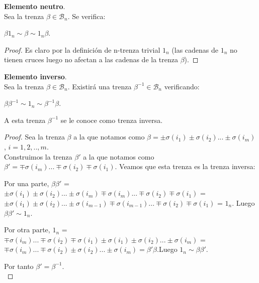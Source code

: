 \documentclass[14pt]{extarticle}
\begin{document}
\begin{pro}  \textbf{Elemento neutro}.\label{prodneutro}\\
	Sea la trenza $\beta \in \mathscr{B}_{n}$. Se verifica:
	\begin{center}
		 $\beta 1_{n} \sim \beta \sim 1_{n} \beta$.
	\end{center}
	
	\begin{proof}	
		Es claro por la definición de n-trenza trivial $ 1_{n} $ (las cadenas de $ 1_{n} $ no tienen cruces luego no afectan a las cadenas de la trenza $ \beta $). 
	\end{proof}
\end{pro}

\begin{pro}  \textbf{Elemento inverso}.\label{prodinverso}\\
	Sea la trenza $\beta \in \mathscr{B}_{n}$. Existirá una trenza $\beta^{-1} \in \mathscr{B}_{n}$ verificando:
	\begin{center}
		$\beta \beta^{-1} \sim 1_{n} \sim \beta^{-1} \beta$.
	\end{center}
	A esta trenza $\beta^{-1}$ se le conoce como trenza inversa.
	
	\begin{proof} 
		Sea la trenza $\beta$ a la que notamos como $\beta = \pm \sigma(i_{1}) \pm \sigma(i_{2}) ... \pm \sigma(i_{m})$, $ i=1,2,..,m. $\\

		 Construimos la trenza $\beta'$ a la que notamos como $\beta' = \mp \sigma(i_{m}) ...\mp \sigma(i_{2}) \mp \sigma(i_{1})$. Veamos que esta trenza es la trenza inversa:
			\begin{center}
			 Por una parte, $\beta \beta'$ = $\pm \sigma(i_{1}) \pm \sigma(i_{2}) ... \pm \sigma(i_{m}) \mp \sigma(i_{m}) ...\mp \sigma(i_{2}) \mp \sigma(i_{1})$ = $\pm \sigma(i_{1}) \pm \sigma(i_{2}) ... \pm \sigma(i_{m-1}) \mp \sigma(i_{m-1}) ...\mp \sigma(i_{2}) \mp \sigma(i_{1})$ = $ 1_{n} $. Luego $\beta \beta' \sim 1_{n}$.\\
			\end{center}		 
			\begin{center}
			 Por otra parte, $ 1_{n} $ = $\mp \sigma(i_{m}) ...\mp \sigma(i_{2}) \mp \sigma(i_{1}) \pm \sigma(i_{1}) \pm \sigma(i_{2}) ... \pm \sigma(i_{m})$ = $\mp \sigma(i_{m}) ...\mp \sigma(i_{2}) \pm \sigma(i_{2}) ... \pm \sigma(i_{m}) = \beta' \beta$.Luego $1_{n} \sim \beta \beta'$.\\
			\end{center}
		 Por tanto $\beta' = \beta^{-1}$.\\
		 

\end{proof}
\end{pro}
\end{document}
